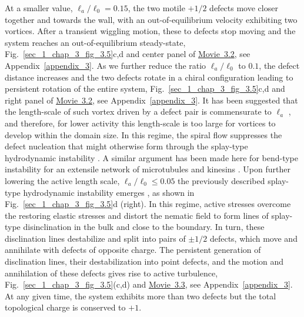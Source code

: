 At a smaller value, $\ell_a/\ell_0 = 0.15$, the two motile $+1/2$ defects move closer together and  towards the wall, with an out-of-equilibrium velocity exhibiting two vortices. After a transient wiggling motion, these to defects stop moving and the system reaches an out-of-equilibrium steady-state,  Fig.~\ref{sec_1_chap_3_fig_3.5}c,d and center panel of \href{https://github.com/waleedmirzaPhD/movies_thesis.git}{Movie~3.2}, see Appendix~\ref{appendix_3}. As we further reduce the ratio $\ell_a/\ell_0$ to $0.1$, the defect distance increases and the two defects rotate in a chiral configuration leading to persistent rotation of the entire system, Fig.~\ref{sec_1_chap_3_fig_3.5}c,d and 
right panel of \href{https://github.com/waleedmirzaPhD/movies_thesis.git}{Movie~3.2}, see Appendix~\ref{appendix_3}. It has been suggested  that the length-scale of such vortex driven by a defect pair is commensurate to $\ell_a$ \cite{chandrakar2020}, and therefore, for lower activity this length-scale is too large for vortices to develop within the domain size. In this regime, the spiral flow suppresses the defect nucleation that might otherwise form through the splay-type hydrodynamic instability \cite{ramaswamy2007, ramaswamy2010}. A similar argument has been made here for bend-type instability for an extensile network of microtubules and  kinesins \cite{opathalage2019}. Upon further lowering the active length scale, $\ell_a/\ell_0 \leq 0.05$ the previously described splay-type hydrodynamic instability emerges \cite{ramaswamy2007, ramaswamy2010}, as shown in Fig.~\ref{sec_1_chap_3_fig_3.5}d (right). In this regime, active stresses overcome the restoring elastic stresses and distort the nematic field to form lines of splay-type disinclination in the bulk and close to the boundary. In turn, these disclination lines destabilize and split into pairs of $\pm 1/2$ defects, which move and annihilate with defects of opposite charge. The persistent generation of disclination lines, their destabilization into point defects, and the motion and annihilation of these defects gives rise to active turbulence, Fig.~\ref{sec_1_chap_3_fig_3.5}(c,d) and  \href{https://github.com/waleedmirzaPhD/movies_thesis.git}{Movie~3.3}, see Appendix~\ref{appendix_3}. At any given time, the system exhibits  more than two defects but the total topological charge is conserved to $+1$.
